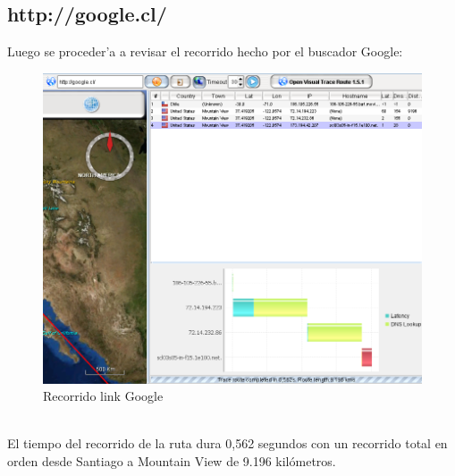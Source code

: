 \documentclass{article}
\begin{document}
\subsection{http://google.cl/}
Luego se proceder'a a revisar el recorrido hecho por el buscador Google:
\\
\begin{figure}[H]
  \centering
    \includegraphics[width=1.0\textwidth]{ruta1_google}
  \caption{Recorrido link Google}
  \label{google}
\end{figure}\\

El tiempo del recorrido de la ruta dura 0,562 segundos con un recorrido total en orden desde Santiago a Mountain View de 9.196 kilómetros.
\end{document}
